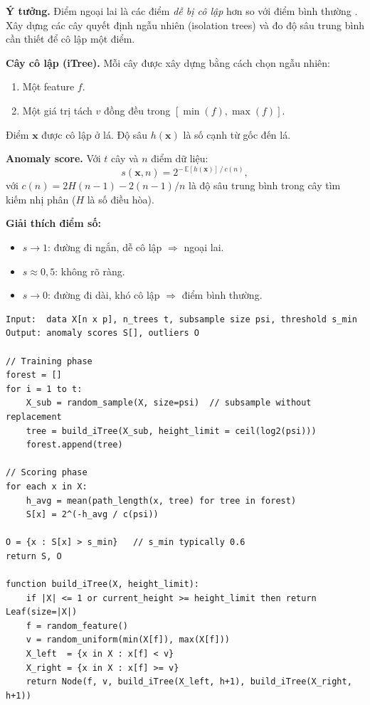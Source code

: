 \documentclass[11pt,a4paper]{article}
\newcommand{\E}{\mathbb{E}}
\begin{document}
\textbf{Ý tưởng.} Điểm ngoại lai là các điểm \textit{dễ bị cô lập} hơn so với điểm bình thường \parencite{liu2008}. Xây dựng các cây quyết định ngẫu nhiên (isolation trees) và đo độ sâu trung bình cần thiết để cô lập một điểm.

\textbf{Cây cô lập (iTree).} Mỗi cây được xây dựng bằng cách chọn ngẫu nhiên:
\begin{enumerate}[noitemsep]
  \item Một feature $f$.
  \item Một giá trị tách $v$ đồng đều trong $[\min(f), \max(f)]$.
\end{enumerate}
Điểm $\mathbf{x}$ được cô lập ở lá. Độ sâu $h(\mathbf{x})$ là số cạnh từ gốc đến lá.

\textbf{Anomaly score.} Với $t$ cây và $n$ điểm dữ liệu:
\begin{equation}
  s(\mathbf{x}, n) = 2^{-\,\E[h(\mathbf{x})]\,/\,c(n)},
\end{equation}
với $c(n) = 2H(n-1) - 2(n-1)/n$ là độ sâu trung bình trong cây tìm kiếm nhị phân ($H$ là số điều hòa).

\textbf{Giải thích điểm số:}
\begin{itemize}[noitemsep]
  \item $s \to 1$: đường đi ngắn, dễ cô lập $\Rightarrow$ ngoại lai.
  \item $s \approx 0{,}5$: không rõ ràng.
  \item $s \to 0$: đường đi dài, khó cô lập $\Rightarrow$ điểm bình thường.
\end{itemize}

\begin{lstlisting}[style=pseudo, caption={Isolation Forest}, label={lst:iforest}]
Input:  data X[n x p], n_trees t, subsample size psi, threshold s_min
Output: anomaly scores S[], outliers O

// Training phase
forest = []
for i = 1 to t:
    X_sub = random_sample(X, size=psi)  // subsample without replacement
    tree = build_iTree(X_sub, height_limit = ceil(log2(psi)))
    forest.append(tree)

// Scoring phase
for each x in X:
    h_avg = mean(path_length(x, tree) for tree in forest)
    S[x] = 2^(-h_avg / c(psi))

O = {x : S[x] > s_min}   // s_min typically 0.6
return S, O

function build_iTree(X, height_limit):
    if |X| <= 1 or current_height >= height_limit then return Leaf(size=|X|)
    f = random_feature()
    v = random_uniform(min(X[f]), max(X[f]))
    X_left  = {x in X : x[f] < v}
    X_right = {x in X : x[f] >= v}
    return Node(f, v, build_iTree(X_left, h+1), build_iTree(X_right, h+1))
\end{lstlisting}
\end{document}
